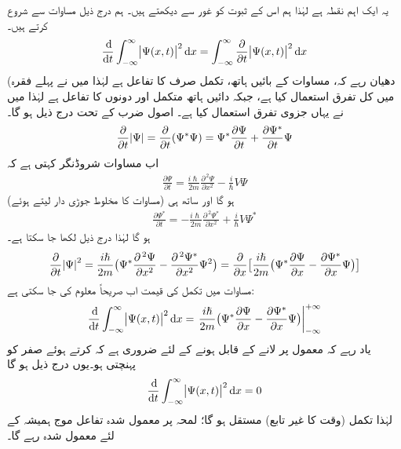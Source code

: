  یہ ایک اہم نقطہ ہے لہٰذا ہم اس کے ثبوت کو غور سے دیکھتے ہیں۔ ہم درج ذیل مساوات سے شروع کرتے ہیں۔
\begin{align}\label{مساوات_تفاعل_موج_الف}
\frac{\dif}{\dif t} \int_{-\infty}^{\infty} \abs{ \Psi (x , t)}^2 \dif x = \int_{- \infty}^{\infty} \frac{ \partial}{\partial t} \abs{ \Psi (x , t)}^2 \dif x 
\end{align}
(دھیان رہے  کہ، مساوات کے بائیں ہاتھ، تکمل صرف   کا تفاعل ہے لہٰذا میں نے پہلے فقرہ میں کل تفرق  استعمال کیا ہے، جبکہ دائیں ہاتھ متکمل  اور  دونوں کا تفاعل ہے لہٰذا میں نے یہاں جزوی تفرق  استعمال کیا ہے۔  اصول ضرب کے تحت درج ذیل ہو گا۔
\begin{align}
\frac{\partial}{\partial t}\abs{\Psi}=\frac{\partial}{\partial t}(\Psi^*\Psi)=\Psi^*\frac{\partial \Psi}{\partial t}+\frac{\partial \Psi^*}{\partial t}\Psi
\end{align}
اب مساوات شروڈنگر کہتی ہے کہ 
\begin{align}\label{مساوات_تفاعل_موج_شروڈنگر_تفرق_الف}
\frac{\partial \Psi}{\partial t}=\frac{i\hslash}{2m}\frac{\partial^{\,2}\Psi}{\partial x^2}-\frac{i}{\hslash}V\Psi
\end{align}
ہو گا اور ساتھ ہی  (مساوات  کا مخلوط جوڑی دار لیتے ہوئے) 
\begin{align}\label{مساوات_تفاعل_موج_آخر}
\frac{\partial \Psi^*}{\partial t}=-\frac{i\hslash}{2m}\frac{\partial^{\,2}\Psi^*}{\partial x^2}+\frac{i}{\hslash}V\Psi^*
\end{align}
ہو گا لہٰذا درج ذیل لکھا جا سکتا ہے۔
\begin{align}\label{مساوات_تفاعل_موج_صریحاً_تکمل_الف}
\frac{\partial}{\partial t}\abs{\Psi}^2=\frac{i\hslash}{2m}\big(\Psi^*\frac{\partial^{\,2} \Psi}{\partial x^2}-\frac{\partial^{\,2}\Psi^*}{\partial x^2}\Psi^2\big)=\frac{\partial}{\partial x}\big[\frac{i\hslash}{2m}\big(\Psi^*\frac{\partial \Psi}{\partial x}-\frac{\partial \Psi^*}{\partial x}\Psi\big)\big]
\end{align}
مساوات  میں تکمل کی قیمت اب  صریحاً معلوم کی جا سکتی ہے:
\begin{align}
\frac{\dif}{\dif t}\int_{-\infty}^{\infty}\abs{\Psi(x,t)}^2\dif x=\left .\frac{i\hslash}{2m}\big(\Psi^*\frac{\partial \Psi}{\partial x}-\frac{\partial \Psi^*}{\partial x}\Psi\big)\right\vert_{-\infty}^{+\infty}
\end{align}
یاد رہے کہ معمول پر لانے کے قابل ہونے کے لئے ضروری ہے کہ  کرتے ہوئے  صفر کو پہنچتی ہو۔یوں درج ذیل ہو گا
\begin{align}\label{مساوات_تفاعل_موج_تکمل_مستقل_ہو_گا}
\frac{\dif}{\dif t}\int_{-\infty}^{\infty}\abs{\Psi(x,t)}^2\dif x=0
\end{align}
لہٰذا تکمل (وقت کا غیر تابع) مستقل ہو گا؛ لمحہ  پر معمول شدہ تفاعل موج ہمیشہ کے لئے معمول شدہ رہے گا۔

